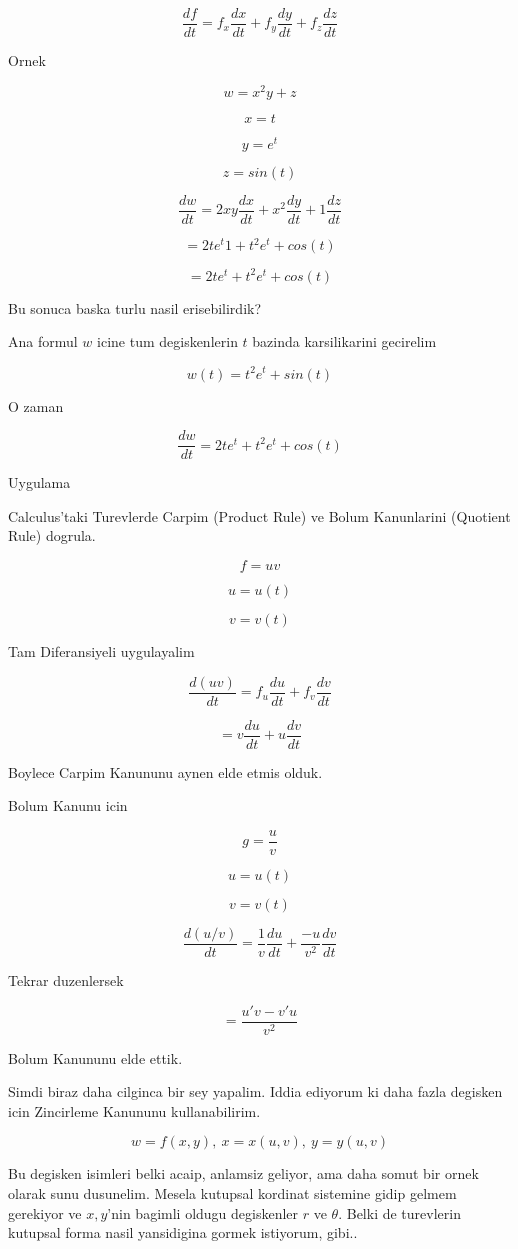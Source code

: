 \documentclass[12pt,fleqn]{article}\usepackage{../common}
\begin{document}
\[ \frac{df}{dt} = f_x\frac{dx}{dt} + f_y\frac{dy}{dt} + f_z\frac{dz}{dt} \]

Ornek

\[ w = x^2y + z \]

\[ x = t \]

\[ y = e^t \]

\[ z = sin(t) \]

\[ \frac{dw}{dt} = 2xy \frac{dx}{dt} + x^2 \frac{dy}{dt} + 1 \frac{dz}{dt}\]

\[ = 2te^t 1 + t^2e^t+cos(t) \]

\[ = 2te^t + t^2e^t+cos(t) \]

Bu sonuca baska turlu nasil erisebilirdik? 

Ana formul $w$ icine tum degiskenlerin $t$ bazinda karsilikarini gecirelim

\[ w(t) = t^2e^t + sin(t) \]

O zaman

\[ \frac{dw}{dt} = 2te^t + t^2e^t + cos(t) \]

Uygulama

Calculus'taki Turevlerde Carpim (Product Rule) ve Bolum Kanunlarini
(Quotient Rule) dogrula.

\[ f = uv \]

\[ u=u(t) \]

\[ v=v(t) \]

Tam Diferansiyeli uygulayalim

\[ \frac{d(uv)}{dt} = f_u\frac{du}{dt} + f_v \frac{dv}{dt}\]

\[  = v\frac{du}{dt} + u \frac{dv}{dt}\]

Boylece Carpim Kanununu aynen elde etmis olduk. 

Bolum Kanunu icin

\[ g = \frac{u}{v} \]

\[ u=u(t) \]

\[ v=v(t) \]

\[ \frac{d(u/v)}{dt} = \frac{1}{v} \frac{du}{dt} + \frac{-u}{v^2}\frac{dv}{dt}\]

Tekrar duzenlersek

\[ = \frac{u'v - v'u}{v^2} \]

Bolum Kanununu elde ettik.

Simdi biraz daha cilginca bir sey yapalim. Iddia ediyorum ki daha fazla
degisken icin Zincirleme Kanununu kullanabilirim. 

\[ w = f(x,y), \ x = x(u,v), \ y = y(u,v) \]

Bu degisken isimleri belki acaip, anlamsiz geliyor, ama daha somut bir
ornek olarak sunu dusunelim. Mesela kutupsal kordinat sistemine gidip
gelmem gerekiyor ve $x,y$'nin bagimli oldugu degiskenler $r$ ve
$\theta$. Belki de turevlerin kutupsal forma nasil yansidigina gormek
istiyorum, gibi..
\end{document}
